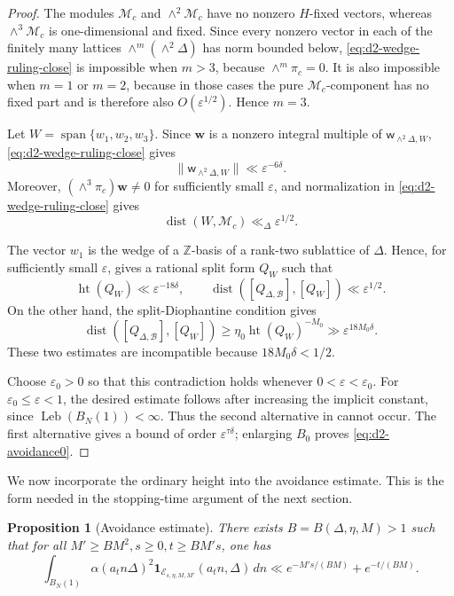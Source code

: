 \documentclass[reqno,11pt]{amsart}
\newtheorem{prop}[prop]{Proposition}
\theoremstyle{definition}
\theoremstyle{remark}
\numberwithin{equation}{section}
\newcommand{\Leb}{\operatorname{Leb}}
\begin{document}
\begin{proof}
The modules $\mathcal M_c$ and $\wedge^2\mathcal M_c$ have no nonzero
$H$-fixed vectors, whereas $\wedge^3\mathcal M_c$ is one-dimensional and
fixed. Since every nonzero vector in each of the finitely many lattices
$\wedge^m(\wedge^2\Delta)$ has norm bounded below,
\eqref{eq:d2-wedge-ruling-close} is impossible when $m>3$, because
$\wedge^m\pi_c=0$. It is also impossible when $m=1$ or $m=2$, because in
those cases the pure $\mathcal M_c$-component has no fixed part and is
therefore also $O(\varepsilon^{1/2})$. Hence $m=3$.

Let
$
W=\operatorname{span}\{w_1,w_2,w_3\}.
$
Since $\mathbf w$ is a nonzero integral multiple of
$\mathsf w_{\wedge^2\Delta,W}$,
\eqref{eq:d2-wedge-ruling-close} gives
$$
\|\mathsf w_{\wedge^2\Delta,W}\|
\ll
\varepsilon^{-6\delta}.
$$
Moreover, $(\wedge^3\pi_c)\mathbf w\ne0$ for sufficiently small
$\varepsilon$, and normalization in
\eqref{eq:d2-wedge-ruling-close} gives
$$
\operatorname{dist}(W,\mathcal M_c)
\ll_\Delta
\varepsilon^{1/2}.
$$

The vector $w_1$ is the wedge of a $\mathbb Z$-basis of a rank-two
sublattice of $\Delta$. Hence, for sufficiently small $\varepsilon$,
 gives a rational split form
$Q_W$ such that
$$
\operatorname{ht}(Q_W)
\ll
\varepsilon^{-18\delta},
\qquad
\operatorname{dist}([Q_{\Delta,\mathcal B}],[Q_W])
\ll
\varepsilon^{1/2}.
$$
On the other hand, the split-Diophantine condition gives
$$
\operatorname{dist}([Q_{\Delta,\mathcal B}],[Q_W])
\ge
\eta_0\operatorname{ht}(Q_W)^{-M_0}
\gg
\varepsilon^{18M_0\delta}.
$$
These two estimates are incompatible because
$18M_0\delta<1/2$.

Choose $\varepsilon_0>0$ so that this contradiction holds whenever
$0<\varepsilon<\varepsilon_0$. For
$\varepsilon_0\le\varepsilon<1$, the desired estimate follows after
increasing the implicit constant, since $\Leb(B_N(1))<\infty$. Thus the
second alternative in  cannot occur. The first
alternative gives a bound of order $\varepsilon^{\tau\delta}$; enlarging
$B_0$ proves \eqref{eq:d2-avoidance0}.
\end{proof}

We now incorporate the ordinary height into the avoidance estimate. This is
the form needed in the stopping-time argument of the next section.

\begin{prop}[Avoidance estimate]
\label{prop:avoidance'}
There exists $B=B(\Delta,\eta,M)>1$ such that for all
$M'\ge BM^2, s\ge0, t\ge BM's$,
one has
\begin{equation}\label{eq:d2-avoidance}
\int_{B_N(1)}
\alpha(a_tn\Delta)^2
\mathbf 1_{\mathcal E_{s,\eta,M,M'}}(a_tn,\Delta)\,dn
\ll
e^{-M's/(BM)}+e^{-t/(BM)}.
\end{equation}
\end{prop}
\end{document}
